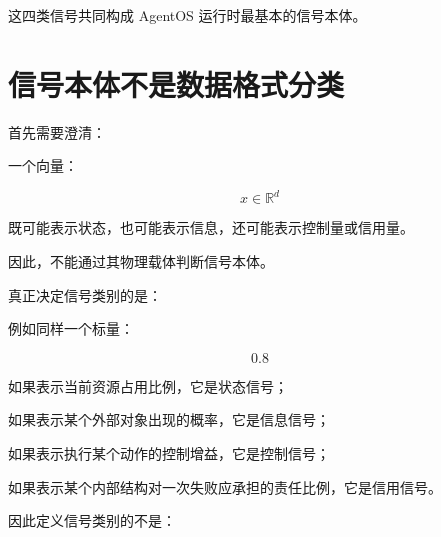 \begin{statementbox}
\centering
{}
\end{statementbox}

\begin{statementbox}
\centering
{}
\end{statementbox}

\begin{statementbox}
\centering
{}
\end{statementbox}

这四类信号共同构成 AgentOS 运行时最基本的信号本体。

\section{信号本体不是数据格式分类}

首先需要澄清：

\begin{statementbox}
\centering
{}
\end{statementbox}

一个向量：

\[
x\in\mathbb R^d
\]

既可能表示状态，也可能表示信息，还可能表示控制量或信用量。

因此，不能通过其物理载体判断信号本体。

真正决定信号类别的是：

\begin{statementbox}
\centering
{}
\end{statementbox}

例如同样一个标量：

\[
0.8
\]

如果表示当前资源占用比例，它是状态信号；

如果表示某个外部对象出现的概率，它是信息信号；

如果表示执行某个动作的控制增益，它是控制信号；

如果表示某个内部结构对一次失败应承担的责任比例，它是信用信号。

因此定义信号类别的不是：

